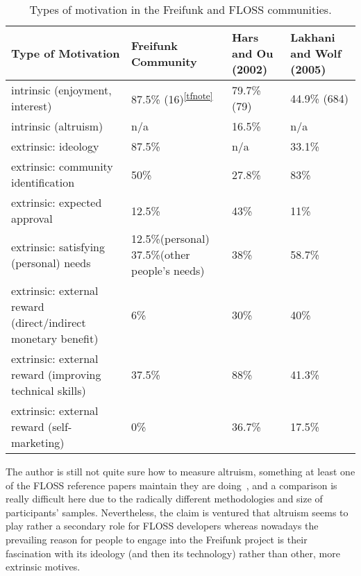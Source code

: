 \begin{table}[h]
  \begin{tabular}{| p{4cm} | p{4cm} | p{4cm} | p{4cm} |}
    \hline
    \textbf{Type of Motivation} & \textbf{Freifunk Community} & \textbf{Hars and Ou (2002)} & \textbf{Lakhani and Wolf (2005)}\\
    \hline
    intrinsic (enjoyment, interest) & 87.5\% (16)\textsuperscript{\ref{tfnote}}& 79.7\% (79) & 44.9\% (684) \\
    \hline
    intrinsic (altruism) & n/a & 16.5\% & n/a \\
    \hline
    extrinsic: ideology & 87.5\% & n/a & 33.1\% \\
    \hline
    extrinsic: community identification & 50\% & 27.8\% & 83\% \\
    \hline
    extrinsic: expected approval & 12.5\% & 43\% & 11\% \\
    \hline
    extrinsic: satisfying (personal) needs & 12.5\%(personal) 37.5\%(other people's needs) & 38\% & 58.7\% \\
    \hline
    extrinsic: external reward (direct/indirect monetary benefit)& 6\% & 30\% & 40\% \\
    \hline
    extrinsic: external reward (improving technical skills)& 37.5\% & 88\% & 41.3\% \\
    \hline
    extrinsic: external reward (self-marketing)& 0\% & 36.7\% & 17.5\% \\
    \hline
  \end{tabular}
  \caption{Types of motivation in the Freifunk and FLOSS communities.}
\label{tab:motivation}
\end{table}



The author is still not quite sure how to measure altruism, something at least one of the FLOSS reference papers maintain they are doing~\cite{HarOu2002}, and a comparison is really difficult here due to the radically different methodologies and size of participants' samples.
Nevertheless, the claim is ventured that altruism seems to play rather a secondary role for FLOSS developers whereas nowadays the prevailing reason for people to engage into the Freifunk project is their fascination with its ideology (and then its technology) rather than other, more extrinsic motives.


